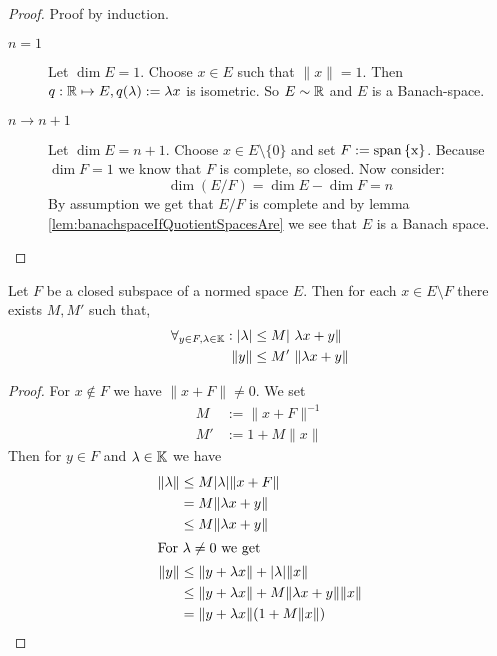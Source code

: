 \begin{proof}
	Proof by induction.
	\begin{description}
		\item[$n=1$] Let $\dim{E} = 1$. Choose $x \in E$ such that $\|x\|=1$.
			Then $q: \mathbb{R} \mapsto E, q(\lambda) := \lambda x$ is isometric. So $E \sim \mathbb{R}$
			and $E$ is a Banach-space.
		\item[$n\to n+1$] Let $\dim{E} = n+1$. Choose $x \in E \setminus \{0\}$ and set $F := \operatorname{span\left\{x\right\}}$.
			Because $\dim{F} = 1$ we know that $F$ is complete, so closed. Now consider:
			\begin{equation*}
				\dim(E / F) = \dim E - \dim F = n
			\end{equation*}
			By assumption we get that $E / F$ is complete and by lemma \ref{lem:banachspaceIfQuotientSpacesAre}
			we see that $E$ is a Banach space.
	\end{description}
\end{proof}

\begin{lemma}
	Let $F$ be a closed subspace of a normed space $E$. Then for each $x \in E \setminus F$
	there exists $M,M'$ such that,
	\begin{align*}
		\forall_{y\in F, \lambda \in \K} : |\lambda| &\le M |\ \lambda x + y \| \\
										\|y\| &\le M'\ \|\lambda x +y\|
	\end{align*}
\end{lemma}

\begin{proof}
	For $x \nin F$ we have $\|x + F\| \neq 0$. We set
	\begin{align*}
		M	&:= \|x + F\|^{-1} \\
		M'	&:= 1 + M \|x\|
	\end{align*}
	Then for $y \in F$ and $\lambda \in \mathbb{K}$ we have
	\begin{align*}
		\|\lambda\|	&\le	M |\lambda| \|x + F\| \\
					&=		M \|\lambda x + y\| \\
					&\le	M \|\lambda x + y\| \\
		\intertext{For $\lambda \neq 0$ we get}
		\|y\|		&\le	\|y + \lambda x\| + |\lambda| \|x\| \\
					&\le	\|y + \lambda x\| + M \|\lambda x + y\| \|x\| \\
					&=		\|y + \lambda x\| ( 1 + M \|x\|)
	\end{align*}
\end{proof}
